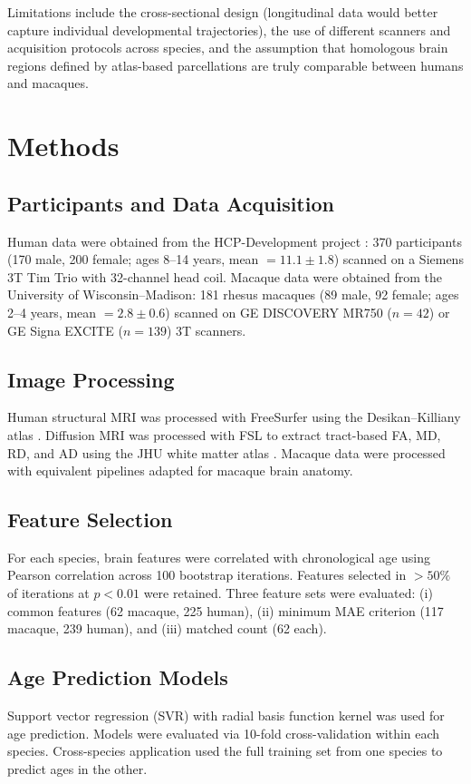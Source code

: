 \documentclass[11pt]{article}
\begin{document}
Limitations include the cross-sectional design (longitudinal data would better capture individual developmental trajectories), the use of different scanners and acquisition protocols across species, and the assumption that homologous brain regions defined by atlas-based parcellations are truly comparable between humans and macaques.

\section{Methods}

\subsection{Participants and Data Acquisition}
Human data were obtained from the HCP-Development project \citep{somerville2018lifespan}: 370 participants (170 male, 200 female; ages 8--14 years, mean $= 11.1 \pm 1.8$) scanned on a Siemens 3T Tim Trio with 32-channel head coil. Macaque data were obtained from the University of Wisconsin--Madison: 181 rhesus macaques (89 male, 92 female; ages 2--4 years, mean $= 2.8 \pm 0.6$) scanned on GE DISCOVERY MR750 ($n = 42$) or GE Signa EXCITE ($n = 139$) 3T scanners.

\subsection{Image Processing}
Human structural MRI was processed with FreeSurfer \citep{fischl2012freesurfer} using the Desikan--Killiany atlas \citep{desikan2006automated}. Diffusion MRI was processed with FSL \citep{jenkinson2012fsl} to extract tract-based FA, MD, RD, and AD using the JHU white matter atlas \citep{mori2005mri}. Macaque data were processed with equivalent pipelines adapted for macaque brain anatomy.

\subsection{Feature Selection}
For each species, brain features were correlated with chronological age using Pearson correlation across 100 bootstrap iterations. Features selected in $>50\%$ of iterations at $p < 0.01$ were retained. Three feature sets were evaluated: (i) common features (62 macaque, 225 human), (ii) minimum MAE criterion (117 macaque, 239 human), and (iii) matched count (62 each).

\subsection{Age Prediction Models}
Support vector regression (SVR) with radial basis function kernel was used for age prediction. Models were evaluated via 10-fold cross-validation within each species. Cross-species application used the full training set from one species to predict ages in the other.
\end{document}
